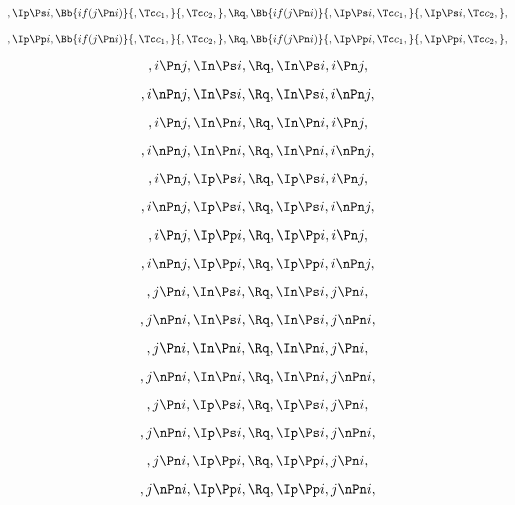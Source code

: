 \bigskip
\bigskip
\[,\Ip \Ps i, \Bb{if(j \Pn i)}{,\Tc c_1,}{,\Tc c_2,}, \Rq ,\Bb{if(j \Pn i)}{,\Ip \Ps i, \Tc c_1,}{,\Ip \Ps i, \Tc c_2,},\]

\bigskip
\bigskip
\[,\Ip \Pp i, \Bb{if(j \Pn i)}{,\Tc c_1,}{,\Tc c_2,}, \Rq ,\Bb{if(j \Pn i)}{,\Ip \Pp i, \Tc c_1,}{,\Ip \Pp i, \Tc c_2,},\]


\bigskip
\bigskip
\[,i \Pn j, \In \Ps i, \Rq , \In \Ps i, i \Pn j,\]

\[,i \nPn j, \In \Ps i, \Rq , \In \Ps i, i \nPn j,\]

\[,i \Pn j, \In \Pn i, \Rq , \In \Pn i, i \Pn j,\]

\[,i \nPn j, \In \Pn i, \Rq , \In \Pn i, i \nPn j,\]

\[,i \Pn j, \Ip \Ps i, \Rq , \Ip \Ps i, i \Pn j,\]

\[,i \nPn j, \Ip \Ps i, \Rq , \Ip \Ps i, i \nPn j,\]

\[,i \Pn j, \Ip \Pp i, \Rq , \Ip \Pp i, i \Pn j,\]

\[,i \nPn j, \Ip \Pp i, \Rq , \Ip \Pp i, i \nPn j,\]



\[,j \Pn i, \In \Ps i, \Rq , \In \Ps i, j \Pn i,\]

\[,j \nPn i, \In \Ps i, \Rq , \In \Ps i, j \nPn i,\]

\[,j \Pn i, \In \Pn i, \Rq , \In \Pn i, j \Pn i,\]

\[,j \nPn i, \In \Pn i, \Rq , \In \Pn i, j \nPn i,\]

\[,j \Pn i, \Ip \Ps i, \Rq , \Ip \Ps i, j \Pn i,\]

\[,j \nPn i, \Ip \Ps i, \Rq , \Ip \Ps i, j \nPn i,\]

\[,j \Pn i, \Ip \Pp i, \Rq , \Ip \Pp i, j \Pn i,\]

\[,j \nPn i, \Ip \Pp i, \Rq , \Ip \Pp i, j \nPn i,\]




\bigskip
\bigskip
